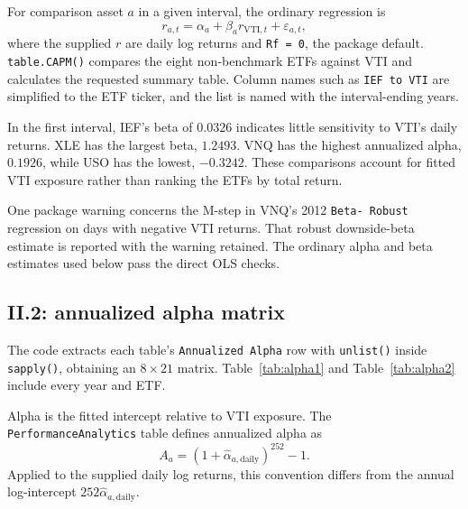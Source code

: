 \documentclass[11pt,letterpaper]{article}
\newcommand{\wideinput}[3]{%
  \begin{table}[H]\centering
  \caption{#2}\label{#3}
  \resizebox{\linewidth}{!}{}
  \end{table}}
\begin{document}
For comparison asset $a$ in a given interval, the ordinary regression is
\begin{equation}
r_{a,t}=\alpha_a+\beta_a r_{\mathrm{VTI},t}+\varepsilon_{a,t},
\label{eq:capm}
\end{equation}
where the supplied $r$ are daily log returns and \texttt{Rf = 0}, the package
default. \texttt{table.CAPM()} compares the eight non-benchmark ETFs against
VTI and calculates the requested summary table. Column names such as
\texttt{IEF to VTI} are simplified to the ETF ticker, and the list is named
with the interval-ending years.

\wideinput{capm_first_year.tex}{Complete CAPM table for the first interval,
2006. The remaining annual tables are in Appendix~\ref{app:capm}. Values
retain the package's four-decimal reporting convention.}{tab:capmfirst}

\begin{samepage}
In the first interval, IEF's beta of $0.0326$ indicates little sensitivity
to VTI's daily returns. XLE has the largest beta, $1.2493$. VNQ has the
highest annualized alpha, $0.1926$, while USO has the lowest, $-0.3242$.
These comparisons account for fitted VTI exposure rather than ranking the
ETFs by total return.\par
\end{samepage}

One package warning concerns the M-step in VNQ's 2012
\texttt{Beta- Robust} regression on days with negative VTI returns. That
robust downside-beta estimate is reported with the warning retained. The
ordinary alpha and beta estimates used below pass the direct OLS checks.

\subsection{II.2: annualized alpha matrix}
The code extracts each table's \texttt{Annualized Alpha} row with
\texttt{unlist()} inside \texttt{sapply()}, obtaining an $8\times21$ matrix.
Table~\ref{tab:alpha1} and Table~\ref{tab:alpha2} include every year and ETF.

\wideinput{alphas_2006_2016.tex}{Annualized alpha, 2006--2016. Entries are
decimal values; for example, $0.1205$ corresponds to 12.05\%.}{tab:alpha1}
\wideinput{alphas_2017_2026.tex}{Annualized alpha, 2017--2026. The 2026
column is based on the partial final endpoint window.}{tab:alpha2}

Alpha is the fitted intercept relative to VTI exposure. The
\texttt{PerformanceAnalytics} table defines annualized alpha as
\begin{equation}
A_a=(1+\widehat\alpha_{a,\mathrm{daily}})^{252}-1.
\label{eq:annualalpha}
\end{equation}
Applied to the supplied daily log returns, this convention differs from the
annual log-intercept
$252\widehat\alpha_{a,\mathrm{daily}}$.
\end{document}
